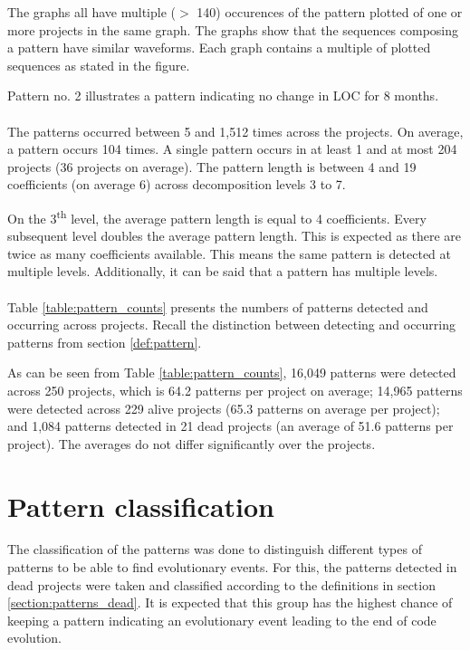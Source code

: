 The graphs all have multiple ($>$ 140) occurences of the pattern plotted of one
or more projects in the same graph. The graphs show that the sequences
composing a pattern have similar waveforms. Each graph contains a multiple of
plotted sequences as stated in the figure.



\noindent
Pattern no. 2 illustrates a pattern indicating no change in LOC for 8 months.

\paragraph{}
The patterns occurred between 5 and 1,512 times across the projects. On
average, a pattern occurs 104 times. A single pattern occurs in at least 1 and
at most 204 projects (36 projects on average). The pattern length is between 4
and 19 coefficients (on average 6) across decomposition levels 3 to 7.

On the 3\textsuperscript{th} level, the average pattern length is equal to 4
coefficients. Every subsequent level doubles the average pattern length. This
is expected as there are twice as many coefficients available. This means the
same pattern is detected at multiple levels. Additionally, it can be said that
a pattern has multiple levels.

\paragraph{}
Table \ref{table:pattern_counts} presents the numbers of patterns
detected and occurring across projects. Recall the distinction between
detecting and occurring patterns from section \ref{def:pattern}.



\noindent
As can be seen from Table \ref{table:pattern_counts}, 16,049 patterns were
detected across 250 projects, which is 64.2 patterns per project on average;
14,965 patterns were detected across 229 alive projects (65.3 patterns on
average per project); and 1,084 patterns detected in 21 dead projects (an
average of 51.6 patterns per project). The averages do not differ significantly
over the projects.



\section{Pattern classification}
The classification of the patterns was done to distinguish different types of
patterns to be able to find evolutionary events. For this, the patterns
detected in dead projects were taken and classified according to
the definitions in section \ref{section:patterns_dead}. It is expected that
this group has the highest chance of keeping a pattern indicating an
evolutionary event leading to the end of code evolution.

